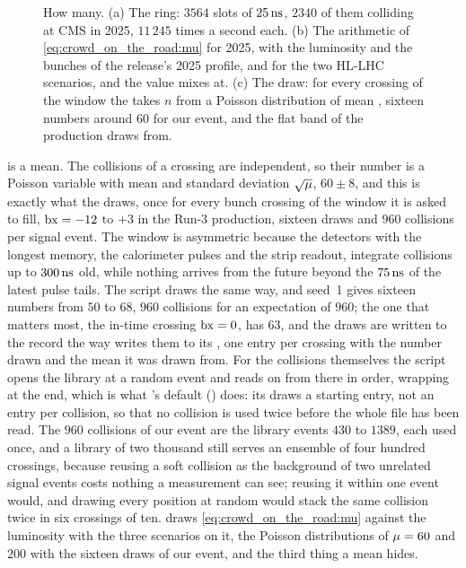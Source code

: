 \begin{figure}[htbp]\centering
\resizebox{\textwidth}{!}{}
\caption[How many: the ring, the arithmetic of $\mup$ and the Poisson
draw]{How many. (a) The ring: $3564$ slots of $25\,\mathrm{ns}$, $2340$ of them
colliding at CMS in 2025, $11\,245$ times a second each. (b) The
arithmetic of \cref{eq:crowd_on_the_road:mu} for 2025, with the
luminosity and the bunches of the release's 2025 profile, and for the two
HL-LHC scenarios, and the value \CMSSW mixes at. (c) The draw: for every
crossing of the window the \Mix takes $n$ from a Poisson distribution of
mean \mup, sixteen numbers around $60$ for our event, and the flat band
of \mutrue the production draws from.}
\label{fig:crowd_on_the_road:mu_sketch}
\end{figure}

\mup is a mean. The collisions of a crossing are independent, so their
number is a Poisson variable with mean \mup and standard deviation
$\sqrt{\mu}$, $60\pm8$, and this is exactly what the \Mix draws, once
for every bunch crossing of the window it is asked to fill, $\mathrm{bx}=-12$ to
$+3$ in the Run-3 production, sixteen draws and $960$ collisions per
signal event. The window is asymmetric because the detectors with the
longest memory, the calorimeter pulses and the strip readout, integrate
collisions up to $300\,\mathrm{ns}$ old, while nothing arrives from the future
beyond the $75\,\mathrm{ns}$ of the latest pulse tails. The script draws the same
way, and seed~1 gives sixteen numbers from $50$ to $68$, $960$ collisions
for an expectation of $960$; the one that matters most, the in-time
crossing $\mathrm{bx}=0$, has $63$, and the draws are written to the record the
way \CMSSW writes them to its , one entry per
crossing with the number drawn and the mean it was drawn from. For the
collisions themselves the script opens the library at a random event and
reads on from there in order, wrapping at the end, which is what \CMSSW's
default () does: its  draws a
starting entry, not an entry per collision, so that no collision is used
twice before the whole file has been read. The $960$ collisions of our
event are the library events $430$ to $1389$, each used once, and a
library of two thousand still serves an ensemble of four hundred
crossings, because reusing a soft collision as the background of two
unrelated signal events costs nothing a measurement can see; reusing it
within one event would, and drawing every position at random would stack
the same collision twice in six crossings of ten.
 draws
\cref{eq:crowd_on_the_road:mu} against the luminosity with the three
scenarios on it, the Poisson distributions of $\mu=60$ and $200$ with
the sixteen draws of our event, and the third thing a mean hides.

